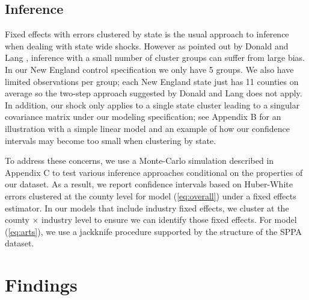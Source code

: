 \documentclass[12pt]{article}
\begin{document}
\begin{comment}
\begin{figure}[H]
	\centering
	\begin{subfigure}[b]{0.495\textwidth}
		\texttt{[image: resources/graphpoint\_diff\_ne\_pop\_ddd\_synth]}
		\caption{Non-Employers}
	\end{subfigure}
		\begin{subfigure}[b]{0.495\textwidth}
		\texttt{[image: resources/graphpoint\_diff\_em\_pop\_ddd\_synth]}
		\caption{Small businesses}
	\end{subfigure}
	\caption{Treatment Effect of triple difference model with synthetic control}
\end{figure}
\end{comment}

\subsection{Inference}

Fixed effects with errors clustered by state is the usual approach to inference when dealing with state wide shocks. However as pointed out by Donald and Lang \citep{donald2007inference}, inference with a small number of cluster groups can suffer from large bias. In our New England control specification we only have 5 groups. We also have limited observations per group; each New England state just has 11 counties on average so the two-step approach suggested by Donald and Lang does not apply. In addition, our shock only applies to a single state cluster leading to a singular covariance matrix under our modeling specification; see Appendix B for an illustration with a simple linear model and an example of how our confidence intervals may become too small when clustering by state. 

To address these concerns, we use a Monte-Carlo simulation described in Appendix C to test various inference approaches conditional on the properties of our dataset. As a result, we report confidence intervals based on Huber-White errors clustered at the county level for model (\ref{eq:overall}) under a fixed effects estimator. In our models that include industry fixed effects, we cluster at the county $\times$ industry level to ensure we can identify those fixed effects. For model (\ref{eq:arts}), we use a jackknife procedure supported by the structure of the SPPA dataset.  

\section{Findings}
\label{sec:results}
\end{document}
